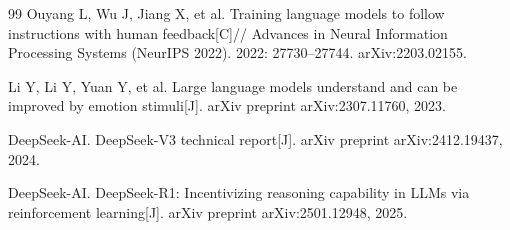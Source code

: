 \documentclass[11pt,a4paper]{article}
\begin{document}
\begin{thebibliography}{99}
Ouyang L, Wu J, Jiang X, et al.
Training language models to follow instructions with human feedback[C]//
Advances in Neural Information Processing Systems (NeurIPS 2022). 2022: 27730--27744.
arXiv:2203.02155.

Li Y, Li Y, Yuan Y, et al.
Large language models understand and can be improved by emotion stimuli[J].
arXiv preprint arXiv:2307.11760, 2023.

DeepSeek-AI.
DeepSeek-V3 technical report[J]. arXiv preprint arXiv:2412.19437, 2024.

DeepSeek-AI.
DeepSeek-R1: Incentivizing reasoning capability in LLMs via reinforcement learning[J].
arXiv preprint arXiv:2501.12948, 2025.

\end{thebibliography}

 
\end{document}
